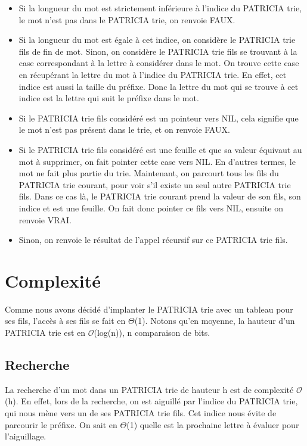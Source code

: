 \documentclass[a4paper,12pt]{report}
\begin{document}
\begin{itemize}
 \item Si la longueur du mot est strictement inférieure à l'indice du PATRICIA trie, le mot n'est pas dans le PATRICIA trie, on renvoie FAUX.
 \item Si la longueur du mot est égale à cet indice, on considère le PATRICIA trie fils de fin de mot. Sinon, on considère le PATRICIA trie fils se trouvant à la case correspondant à la lettre à considérer dans le mot. On trouve cette case en récupérant la lettre du mot à l'indice du PATRICIA trie. En effet, cet indice est aussi la taille du préfixe. Donc la lettre du mot qui se trouve à cet indice est la lettre qui suit le préfixe dans le mot. 
 \item Si le PATRICIA trie fils considéré est un pointeur vers NIL, cela signifie que le mot n'est pas présent dans le trie, et on renvoie FAUX.
 \item Si le PATRICIA trie fils considéré est une feuille et que sa valeur équivaut au mot à supprimer, on fait pointer cette case vers NIL. En d'autres termes, le mot ne fait plus partie du trie. Maintenant, on parcourt tous les fils du PATRICIA trie courant, pour voir s'il existe un seul autre PATRICIA trie fils. Dans ce cas là, le PATRICIA trie courant prend la valeur de son fils, son indice et est une feuille. On fait donc pointer ce fils vers NIL, ensuite on renvoie VRAI.
 \item Sinon, on renvoie le résultat de l'appel récursif sur ce PATRICIA trie fils.
\end{itemize}

\section{Complexité}

Comme nous avons décidé d'implanter le PATRICIA trie avec un tableau pour ses fils, l'accès à ses fils se fait en $\Theta$(1).
Notons qu'en moyenne, la hauteur d'un PATRICIA trie est en $\mathcal{O}$(log(n)), n comparaison de bits.

\subsection{Recherche}
La recherche d'un mot dans un PATRICIA trie de hauteur h est de complexité $\mathcal{O}$(h).
En effet, lors de la recherche, on est aiguillé par l'indice du PATRICIA trie, qui nous mène vers un de ses PATRICIA trie fils. Cet indice nous évite de parcourir le préfixe. On sait en $\Theta$(1) quelle est la prochaine lettre à évaluer pour l'aiguillage.
\end{document}
